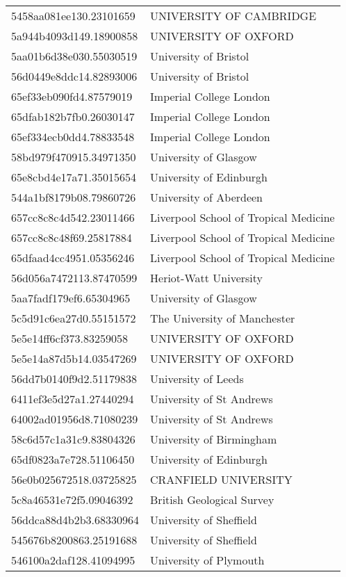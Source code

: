\begin{tabular}{ll}
5458aa081ee130.23101659 & UNIVERSITY OF CAMBRIDGE \\
5a944b4093d149.18900858 & UNIVERSITY OF OXFORD \\
5aa01b6d38e030.55030519 & University of Bristol \\
56d0449e8ddc14.82893006 & University of Bristol \\
65ef33eb090fd4.87579019 & Imperial College London \\
65dfab182b7fb0.26030147 & Imperial College London \\
65ef334ecb0dd4.78833548 & Imperial College London \\
58bd979f470915.34971350 & University of Glasgow \\
65e8cbd4e17a71.35015654 & University of Edinburgh \\
544a1bf8179b08.79860726 & University of Aberdeen \\
657cc8c8c4d542.23011466 & Liverpool School of Tropical Medicine \\
657cc8c8c48f69.25817884 & Liverpool School of Tropical Medicine \\
65dfaad4cc4951.05356246 & Liverpool School of Tropical Medicine \\
56d056a7472113.87470599 & Heriot-Watt University \\
5aa7fadf179ef6.65304965 & University of Glasgow \\
5c5d91c6ea27d0.55151572 & The University of Manchester \\
5e5e14ff6cf373.83259058 & UNIVERSITY OF OXFORD \\
5e5e14a87d5b14.03547269 & UNIVERSITY OF OXFORD \\
56dd7b0140f9d2.51179838 & University of Leeds \\
6411ef3e5d27a1.27440294 & University of St Andrews \\
64002ad01956d8.71080239 & University of St Andrews \\
58c6d57c1a31c9.83804326 & University of Birmingham \\
65df0823a7e728.51106450 & University of Edinburgh \\
56e0b025672518.03725825 & CRANFIELD UNIVERSITY \\
5c8a46531e72f5.09046392 & British Geological Survey \\
56ddca88d4b2b3.68330964 & University of Sheffield \\
545676b8200863.25191688 & University of Sheffield \\
546100a2daf128.41094995 & University of Plymouth \\

\end{tabular}
